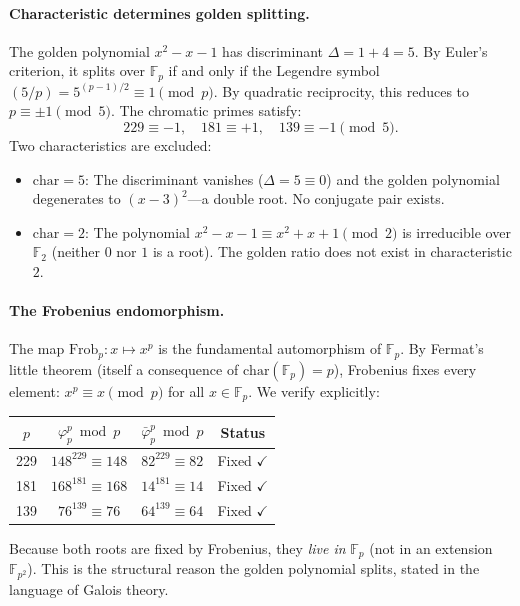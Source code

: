 \paragraph{Characteristic determines golden splitting.}
The golden polynomial $x^2 - x - 1$ has discriminant $\Delta = 1 + 4 = 5$. By Euler's criterion, it splits over $\mathbb{F}_p$ if and only if the Legendre symbol $(5/p) = 5^{(p-1)/2} \equiv 1 \pmod{p}$. By quadratic reciprocity, this reduces to $p \equiv \pm 1 \pmod{5}$. The chromatic primes satisfy:
\[
229 \equiv -1, \quad 181 \equiv +1, \quad 139 \equiv -1 \pmod{5}.
\]
Two characteristics are excluded:
\begin{itemize}
\item $\mathrm{char} = 5$: The discriminant vanishes ($\Delta = 5 \equiv 0$) and the golden polynomial degenerates to $(x - 3)^2$---a double root. No conjugate pair exists.
\item $\mathrm{char} = 2$: The polynomial $x^2 - x - 1 \equiv x^2 + x + 1 \pmod{2}$ is irreducible over $\mathbb{F}_2$ (neither $0$ nor $1$ is a root). The golden ratio does not exist in characteristic $2$.
\end{itemize}

\paragraph{The Frobenius endomorphism.}
The map $\mathrm{Frob}_p: x \mapsto x^p$ is the fundamental automorphism of $\mathbb{F}_p$. By Fermat's little theorem (itself a consequence of $\mathrm{char}(\mathbb{F}_p) = p$), Frobenius fixes every element: $x^p \equiv x \pmod{p}$ for all $x \in \mathbb{F}_p$. We verify explicitly:
\begin{center}
\begin{tabular}{@{}cccc@{}}
\toprule
$p$ & $\varphi_p^p \bmod p$ & $\bar\varphi_p^p \bmod p$ & Status \\
\midrule
229 & $148^{229} \equiv 148$ & $82^{229} \equiv 82$ & Fixed $\checkmark$ \\
181 & $168^{181} \equiv 168$ & $14^{181} \equiv 14$ & Fixed $\checkmark$ \\
139 & $76^{139} \equiv 76$ & $64^{139} \equiv 64$ & Fixed $\checkmark$ \\
\bottomrule
\end{tabular}
\end{center}
Because both roots are fixed by Frobenius, they \emph{live in} $\mathbb{F}_p$ (not in an extension $\mathbb{F}_{p^2}$). This is the structural reason the golden polynomial splits, stated in the language of Galois theory.

